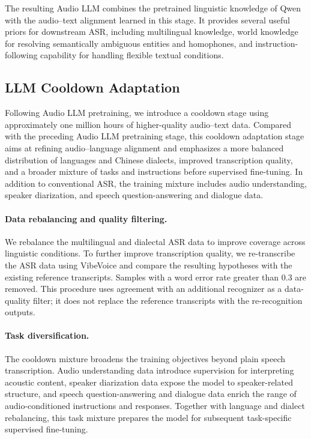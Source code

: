 \documentclass{article}
\begin{document}
The resulting Audio LLM combines the pretrained linguistic knowledge of Qwen with the audio--text alignment learned in this stage. It provides several useful priors for downstream ASR, including multilingual knowledge, world knowledge for resolving semantically ambiguous entities and homophones, and instruction-following capability for handling flexible textual conditions. 
%

%

%
%
%
%
%
%

\subsection{LLM Cooldown Adaptation}
\label{subsec:cooldown}

Following Audio LLM pretraining, we introduce a cooldown stage using approximately one million hours of higher-quality audio--text data. Compared with the preceding Audio LLM pretraining stage, this cooldown adaptation stage aims at refining audio--language alignment and emphasizes a more balanced distribution of languages and Chinese dialects, improved transcription quality, and a broader mixture of tasks and instructions before supervised fine-tuning. In addition to conventional ASR, the training mixture includes audio understanding, speaker diarization, and speech question-answering and dialogue data.

\paragraph{Data rebalancing and quality filtering.}
We rebalance the multilingual and dialectal ASR data to improve coverage across linguistic conditions. To further improve transcription quality, we re-transcribe the ASR data using VibeVoice and compare the resulting hypotheses with the existing reference transcripts. Samples with a word error rate greater than 0.3 are removed. This procedure uses agreement with an additional recognizer as a data-quality filter; it does not replace the reference transcripts with the re-recognition outputs.

\paragraph{Task diversification.}
The cooldown mixture broadens the training objectives beyond plain speech transcription. Audio understanding data introduce supervision for interpreting acoustic content, speaker diarization data expose the model to speaker-related structure, and speech question-answering and dialogue data enrich the range of audio-conditioned instructions and responses. Together with language and dialect rebalancing, this task mixture prepares the model for subsequent task-specific supervised fine-tuning.
\end{document}
